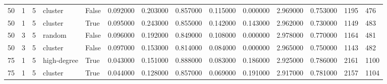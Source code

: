 \begin{table}
\begin{tabular}{llllllllllllll}
50 & 1 & 5 & cluster & False & 0.092000 & 0.203000 & 0.857000 & 0.115000 & 0.000000 & 2.969000 & 0.753000 & 1195 & 476 \\
50 & 1 & 5 & cluster & True & 0.095000 & 0.243000 & 0.855000 & 0.142000 & 0.143000 & 2.962000 & 0.730000 & 1149 & 483 \\
50 & 3 & 5 & random & False & 0.096000 & 0.192000 & 0.849000 & 0.108000 & 0.000000 & 2.978000 & 0.770000 & 1164 & 481 \\
50 & 3 & 5 & cluster & False & 0.097000 & 0.153000 & 0.814000 & 0.084000 & 0.000000 & 2.965000 & 0.750000 & 1143 & 482 \\
75 & 1 & 5 & high-degree & True & 0.043000 & 0.151000 & 0.888000 & 0.083000 & 0.186000 & 2.925000 & 0.786000 & 2161 & 1100 \\
75 & 1 & 5 & cluster & True & 0.044000 & 0.128000 & 0.857000 & 0.069000 & 0.191000 & 2.917000 & 0.781000 & 2157 & 1104 \\
\bottomrule
\end{tabular}
\end{table}
